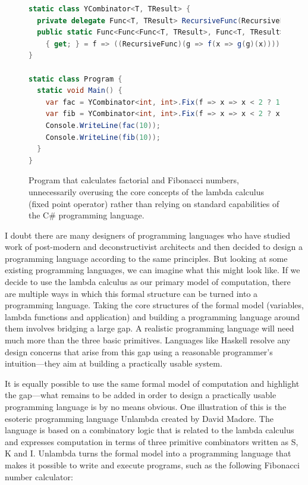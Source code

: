 \begin{figure}
\vspace{-1em}
\begin{lstlisting}[language=csharp]
static class YCombinator<T, TResult> {
  private delegate Func<T, TResult> RecursiveFunc(RecursiveFunc r);
  public static Func<Func<Func<T, TResult>, Func<T, TResult>>, Func<T, TResult>> Fix
    { get; } = f => ((RecursiveFunc)(g => f(x => g(g)(x))))(g => f(x => g(g)(x)));
}

static class Program {
  static void Main() {
    var fac = YCombinator<int, int>.Fix(f => x => x < 2 ? 1 : x * f(x - 1));
    var fib = YCombinator<int, int>.Fix(f => x => x < 2 ? x : f(x - 1) + f(x - 2));
    Console.WriteLine(fac(10));
    Console.WriteLine(fib(10));
  }
}
\end{lstlisting}
\vspace{-0.5em}
\caption{Program that calculates factorial and Fibonacci numbers, unnecessarily overusing
the core concepts of the lambda calculus (fixed point operator) rather than relying on
standard capabilities of the C\# programming language.}
\label{fig:ycombinator}
\vspace{-0.5em}
\end{figure}


I doubt there are many designers of programming languages who have studied work of post-modern
and deconstructivist architects and then decided to design a programming language according to
the same principles. But looking at some existing programming languages, we can imagine what
this might look like. If we decide to use the lambda calculus as our primary model of computation,
there are multiple ways in which this formal structure can be turned into a programming language.
Taking the core structures of the formal model (variables, lambda functions and application) and
building a programming language around them involves bridging a large gap.
A realistic programming language will need much more than the three basic primitives. Languages like
Haskell resolve any design concerns that arise from this gap using a reasonable programmer's
intuition---they aim at building a practically usable system.

It is equally possible to use the same formal model of computation and highlight the gap---what
remains to be added in order to design a practically usable programming language is by
no means obvious. One illustration of this is the esoteric programming language
Unlambda created by David Madore. The language is based on a
combinatory logic that is related to the lambda calculus and expresses computation in terms
of three primitive combinators written as S, K and I. Unlambda turns the formal model into a
programming language that makes it possible to write and execute programs, such as the following
Fibonacci number calculator:

